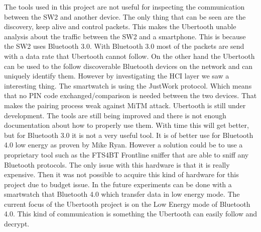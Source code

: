The tools used in this project are not useful for inspecting the communication between the SW2 and another device. The only thing that can be seen are the discovery, keep alive and control packets. This makes the Ubertooth unable analysis about the traffic between the SW2 and a smartphone. This is because the SW2 uses Bluetooth 3.0. With Bluetooth 3.0 most of the packets are send with a data rate that Ubertooth cannot follow. On the other hand the Ubertooth can be used to the follow discoverable Bluetooth devices on the network and can uniquely identify them.\pend
However by investigating the HCI layer we saw a interesting thing. The smartwatch is using the JustWork protocol. Which means that no PIN code exchanged/comparison is needed between the two devices. That makes the pairing process weak against MiTM attack.
Ubertooth is still under development. The tools are still being improved and there is not enough documentation about how to properly use them. With time this will get better, but for Bluetooth 3.0 it is not a very useful tool. It is of better use for Bluetooth 4.0 low energy as proven by Mike Ryan. However a solution could be to use a proprietary tool such as the FTS4BT Frontline sniffer \cite{FTS4BT} that are able to sniff any Bluetooth protocols. The only issue with this hardware is that it is really expensive. Then it was not possible to acquire this kind of hardware for this project due to budget issue.
\pend
In the future experiments can be done with a smartwatch that Bluetooth 4.0 which transfer data in low energy mode. The current focus of the Ubertooth project is on the Low Energy mode of Bluetooth 4.0. This kind of communication is something the Ubertooth can easily follow and decrypt.